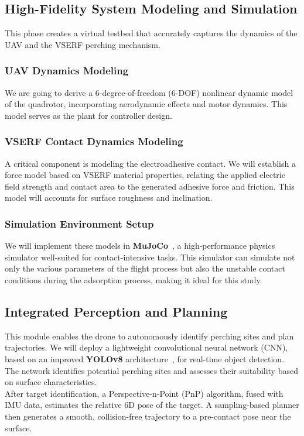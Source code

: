 \documentclass[11pt,a4paper]{article}
\begin{document}
\subsection{High-Fidelity System Modeling and Simulation}
This phase creates a virtual testbed that accurately captures the dynamics of the UAV and the VSERF perching mechanism.


\subsubsection{UAV Dynamics Modeling}
We are going to derive a 6-degree-of-freedom (6-DOF) nonlinear dynamic model of the quadrotor, incorporating aerodynamic effects and motor dynamics. This model serves as the plant for controller design.

\subsubsection{VSERF Contact Dynamics Modeling}
A critical component is modeling the electroadhesive contact. We will establish a force model based on VSERF material properties, relating the applied electric field strength and contact area to the generated adhesive force and friction. This model will accounts for surface roughness and inclination.

\subsubsection{Simulation Environment Setup}
We will implement these models in \textbf{MuJoCo}~\cite{todorov2012mujoco}, a high-performance physics simulator well-suited for contact-intensive tasks. This simulator can simulate not only the various parameters of the flight process but also the unstable contact conditions during the adsorption process, making it ideal for this study.

\subsection{Integrated Perception and Planning}
This module enables the drone to autonomously identify perching sites and plan trajectories. We will deploy a lightweight convolutional neural network (CNN), based on an improved \textbf{YOLOv8} architecture~\cite{zhang2023drone}, for real-time object detection. The network identifies potential perching sites and assesses their suitability based on surface characteristics.\\
After target identification, a Perspective-n-Point (PnP) algorithm, fused with IMU data, estimates the relative 6D pose of the target. A sampling-based planner then generates a smooth, collision-free trajectory to a pre-contact pose near the surface.
\end{document}
